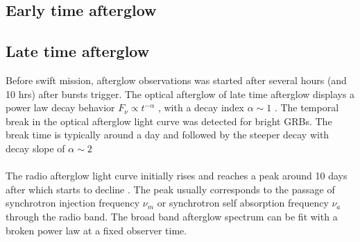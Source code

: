 \subsection{Early time afterglow}
\subsection{Late time afterglow }
Before swift mission, afterglow observations was started after several hours (and 10 hrs) after bursts trigger. The optical afterglow of late time afterglow displays a power law decay behavior $ F_{\nu}   \propto   t^{-\alpha} $  , with a decay index  $\alpha  \sim  1 $ . The temporal break in the optical afterglow light curve was detected for bright GRBs. The break time is typically around a day and followed by the steeper decay with decay slope of $ \alpha  \sim 2 $ \citep{24}\\\\
The radio afterglow light curve initially rises and reaches a peak around 10 days
after which starts to decline . The peak usually corresponds to the passage of synchrotron injection frequency $ \nu_{m} $ or synchrotron self absorption frequency $ \nu_{a} $through the radio band. The broad band afterglow spectrum can be fit with a broken power law at a fixed observer time.\citep{25}
